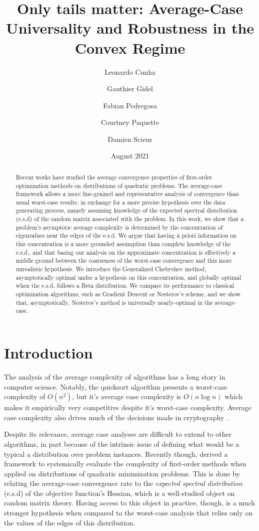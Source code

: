 \documentclass{article}
\title{Only tails matter:
Average-Case Universality and Robustness in the Convex Regime}
\author{Leonardo Cunha
\and Gauthier Gidel \\
\and Fabian Pedregosa \\
\and Courtney Paquette \\
\and Damien Scieur}
\date{August 2021}
\begin{document}
\maketitle
\begin{abstract}
    Recent works have studied the average convergence properties of first-order optimization methods on distributions of quadratic problems. The average-case framework allows a more fine-grained and representative analysis of convergence than usual worst-case results, in exchange for a more precise hypothesis over the data generating process, namely assuming knowledge of the expected spectral distribution (e.s.d) of the random matrix associated with the problem. In this work, we show that a problem's asymptotic average complexity is determined by the concentration of eigenvalues near the edges of the e.s.d. We argue that having à priori information on this concentration is a more grounded assumption than complete knowledge of the e.s.d.,  and that basing our analysis on the approximate concentration is effectively a middle ground between the coarseness of the worst-case convergence and this more unrealistic hypothesis. We introduce the Generalized Chebyshev method, asymptotically optimal under a hypothesis on this concentration, and globally optimal when the e.s.d. follows  a Beta distribution. We compare its performance to classical optimization algorithms, such as Gradient Descent or Nesterov's scheme, and we show that, asymptotically, Nesterov's method is universally nearly-optimal in the average-case.
\end{abstract}
\section{Introduction}
The analysis of the average complexity of algorithms has a long story in computer science. Notably, the quicksort algorithm presents a worst-case complexity of $O(n^2)$, but it's average case complexity is $O(n\log n)$ which makes it  empirically very competitive despite it's worst-case complexity. Average case complexity also drives much of the decisions made in cryptography \citep{bogdanov2006average}.

Despite its relevance, average case analyses are difficult to extend to other algorithms, in part because of the intrinsic issue of defining what would be a typical a distribution over problem instances. Recently though, \cite{pedregosa2020acceleration}  derived a framework to systemically evaluate the complexity of first-order methods when applied on distributions of quadratic minimization problems. This is done by relating the average-case convergence rate to the \textit{expected spectral distribution} (e.s.d) of the objective function's Hessian, which is a well-studied object on random matrix theory. Having access to this object in practice, though, is  a much stronger hypothesis  when compared to the worst-case analysis that relies only on the values of the edges of this distribution. 
\end{document}
